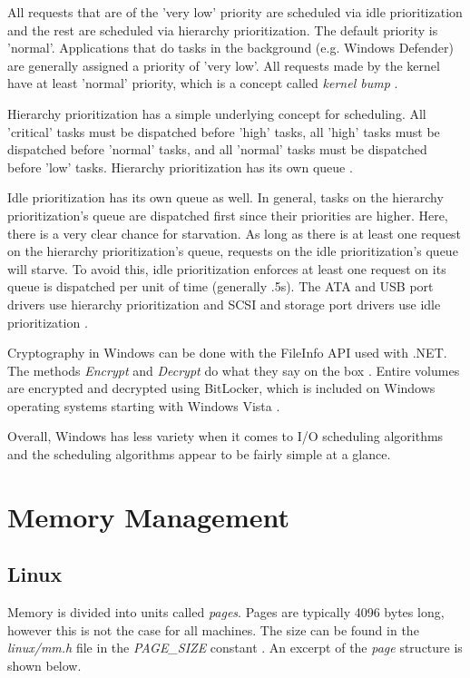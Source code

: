 \documentclass[10pt,draftclsnofoot,onecolumn,journal,compsoc]{IEEEtran}
\begin{document}
All requests that are of the 'very low' priority are scheduled via idle prioritization and the rest are scheduled via hierarchy prioritization. The default priority is 'normal'. Applications that do tasks in the background (e.g. Windows Defender) are generally assigned a priority of 'very low'. All requests made by the kernel have at least 'normal' priority, which is a concept called \textit{kernel bump} \cite{win_shd}.

Hierarchy prioritization has a simple underlying concept for scheduling. All 'critical' tasks must be dispatched before 'high' tasks, all 'high' tasks must be dispatched before 'normal' tasks, and all 'normal' tasks must be dispatched before 'low' tasks. Hierarchy prioritization has its own queue \cite{win_shd}.

Idle prioritization has its own queue as well. In general, tasks on the hierarchy prioritization's queue are dispatched first since their priorities are higher. Here, there is a very clear chance for starvation. As long as there is at least one request on the hierarchy prioritization's queue, requests on the idle prioritization's queue will starve. To avoid this, idle prioritization enforces at least one request on its queue is dispatched per unit of time (generally .5s). The ATA and USB port drivers use hierarchy prioritization and SCSI and storage port drivers use idle prioritization \cite{win_shd}. 

Cryptography in Windows can be done with the FileInfo API used with .NET. The methods \textit{Encrypt} and \textit{Decrypt} do what they say on the box \cite{wincrypt}. Entire volumes are encrypted and decrypted using BitLocker, which is included on Windows operating systems starting with Windows Vista \cite{wincrypt2}.

Overall, Windows has less variety when it comes to I/O scheduling algorithms and the scheduling algorithms appear to be fairly simple at a glance.

\section{Memory Management}
\subsection{Linux}
Memory is divided into units called \textit{pages}. Pages are typically 4096 bytes long, however this is not the case for all machines. The size can be found in the \textit{linux/mm.h} file in the \textit{PAGE\_SIZE} constant \cite{linux_proc}. An excerpt of the \textit{page} structure is shown below.
 
\end{document}
